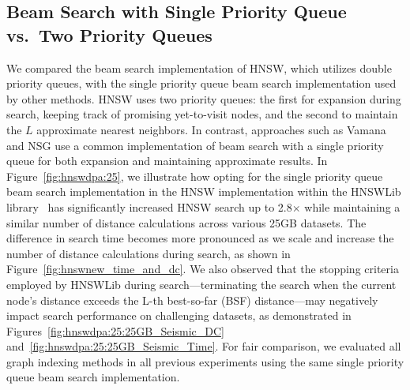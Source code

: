 \subsection{Beam Search with Single Priority Queue vs.\ Two Priority Queues}

We compared the beam search implementation of HNSW, which utilizes double priority queues, with the single priority queue beam search implementation used by other methods. HNSW uses two priority queues: the first for expansion during search, keeping track of promising yet-to-visit nodes, and the second to maintain the $L$ approximate nearest neighbors. In contrast, approaches such as Vamana and NSG use a common implementation of beam search with a single priority queue for both expansion and maintaining approximate results.
In Figure~\ref{fig:hnswdpa:25}, we illustrate how opting for the single priority queue beam search implementation in the HNSW implementation within the HNSWLib library~\cite{url/hnsw} has significantly increased HNSW search up to 2.8$\times$ while maintaining a similar number of distance calculations across various 25GB datasets. The difference in search time becomes more pronounced as we scale and increase the number of distance calculations during search, as shown in Figure~\ref{fig:hnswnew_time_and_dc}. We also observed that the stopping criteria employed by HNSWLib during search—terminating the search when the current node's distance exceeds the L-th best-so-far (BSF) distance—may negatively impact search performance on challenging datasets, as demonstrated in Figures~\ref{fig:hnswdpa:25:25GB_Seismic_DC} and~\ref{fig:hnswdpa:25:25GB_Seismic_Time}. For fair comparison, we evaluated all graph indexing methods in all previous experiments using the same single priority queue beam search implementation. 

